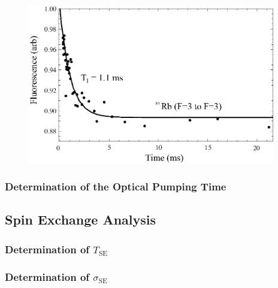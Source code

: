 \begin{figure}[htbp]
\begin{center}
\includegraphics[height=70mm]{./figures/T1.eps}
\caption{\small{}}
\label{fig:}
\end{center}
\end{figure}

\subsubsection{Determination of the Optical Pumping Time}

\subsection{Spin Exchange Analysis}

\subsubsection{Determination of $T_{\mathrm{SE}}$}

\subsubsection{Determination of $\sigma_{\mathrm{SE}}$}